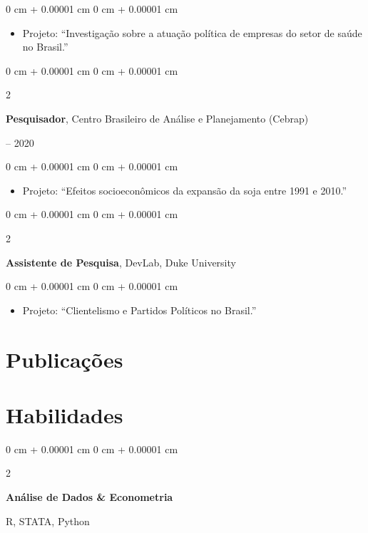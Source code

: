 \documentclass[10pt, letterpaper]{article}
\newenvironment{highlights}{
    \begin{itemize}[
        topsep=0.10 cm,
        parsep=0.10 cm,
        partopsep=0pt,
        itemsep=0pt,
        leftmargin=0 cm + 10pt
    ]
}{
    \end{itemize}
} %
\newenvironment{onecolentry}{
    \begin{adjustwidth}{
        0 cm + 0.00001 cm
    }{
        0 cm + 0.00001 cm
    }
}{
    \end{adjustwidth}
} %
\newenvironment{twocolentry}[2][]{
    \onecolentry
    \def\secondColumn{#2}
    \setcolumnwidth{\fill, 4.5 cm}
    \begin{paracol}{2}
}{
    \switchcolumn \raggedleft \secondColumn
    \end{paracol}
    \endonecolentry
} %
\begin{document}
\vspace{0.10 cm}
\begin{onecolentry}
    \begin{highlights}
        \item Projeto: “Investigação sobre a atuação política de empresas do setor de saúde no Brasil.”
    \end{highlights}
\end{onecolentry}

\vspace{0.2 cm}

\begin{twocolentry}{
    2019 -- 2020
}
    \textbf{Pesquisador}, Centro Brasileiro de Análise e Planejamento (Cebrap)
\end{twocolentry}

\vspace{0.10 cm}
\begin{onecolentry}
    \begin{highlights}
        \item Projeto: “Efeitos socioeconômicos da expansão da soja entre 1991 e 2010.”
    \end{highlights}
\end{onecolentry}

\vspace{0.2 cm}

\begin{twocolentry}{
    2019
}
    \textbf{Assistente de Pesquisa}, DevLab, Duke University
\end{twocolentry}

\vspace{0.10 cm}
\begin{onecolentry}
    \begin{highlights}
        \item Projeto: “Clientelismo e Partidos Políticos no Brasil.”
    \end{highlights}
\end{onecolentry}


\section{Publicações}




\section{Habilidades}

\begin{twocolentry}{
    R, STATA, Python
}
    \textbf{Análise de Dados \& Econometria}
\end{twocolentry}
\end{document}
